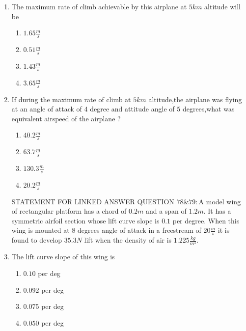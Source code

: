 \documentclass[journal]{IEEEtran}
\begin{document}
\begin{enumerate}
     \item The maximum rate of climb achievable by this airplane at $5 km$ altitude will be
     \begin{enumerate}
         \item $1.65\frac{m}{s}$
         \item $0.51\frac{m}{s}$
         \item $1.43\frac{m}{s}$
         \item $3.65\frac{m}{s}$
     \end{enumerate}
     \item If during the maximum rate of climb at $5km$ altitude,the airplane was flying at an angle of attack of $4$ degree and attitude  angle of $5$ degrees,what was equivalent airspeed of the airplane ?
     \begin{enumerate}
         \item $40.2\frac{m}{s}$
         \item $63.7\frac{m}{s}$
         \item $130.3\frac{m}{s}$
         \item $20.2\frac{m}{s}$
     \end{enumerate}
     STATEMENT FOR LINKED ANSWER QUESTION $78\&79:$A model wing of rectangular platform has a chord of $0.2 m$ and a span of $1.2 m.$ It has a symmetric airfoil section whose lift curve slope is $0.1$ per degree. When this wing is mounted at 8 degrees angle of attack in a freestream of $20 \frac{m}{s}$ it is found to develop $35.3 N$ lift when the density of air is $1.225 \frac{kg}{m^3}.$
    \item The lift curve slope of this wing is
    \begin{enumerate}
        \item $0.10$ per deg
        \item $0.092$ per deg
        \item $0.075$ per deg
        \item $0.050$ per deg
    \end{enumerate}

\end{enumerate}
\end{document}
